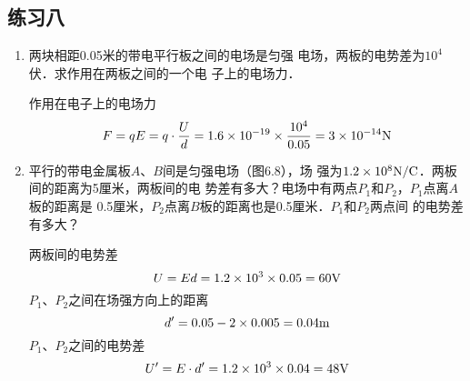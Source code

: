 \subsection{练习八}

\begin{enumerate}
	\item 两块相距0.05米的带电平行板之间的电场是匀强
	电场，两板的电势差为$10^4$伏．求作用在两板之间的一个电
	子上的电场力．

    \begin{solution}
        作用在电子上的电场力
\[F=qE=q\cdot \frac{U}{d}=1.6\times 10^{-19}\times \frac{10^4}{0.05}=3\times 10^{-14}{\rm N}\]
    \end{solution}
    
	\item 平行的带电金属板$A$、$B$间是匀强电场（图6.8），场
	强为$1.2\times10^8\text{N}/\text{C}$．两板间的距离为5厘米，两板间的电
	势差有多大？电场中有两点$P_1$和$P_2$，$P_1$点离$A$板的距离是
	0.5厘米，$P_2$点离$B$板的距离也是0.5厘米．$P_1$和$P_2$两点间
	的电势差有多大？

    \begin{figure}[htp]\centering
        \caption{}
    \end{figure}	
    \begin{solution}
两板间的电势差
\[U=Ed=1.2\times10^3\times0.05=60{\rm V}\]
$P_1$、$P_2$之间在场强方向上的距离
\[d'=0.05-2\times0.005=0.04{\rm m}\]
$P_1$、$P_2$之间的电势差
\[U'=E\cdot d'=1.2\times10^3\times0.04=48{\rm V}\]
    \end{solution}
    
\end{enumerate}


